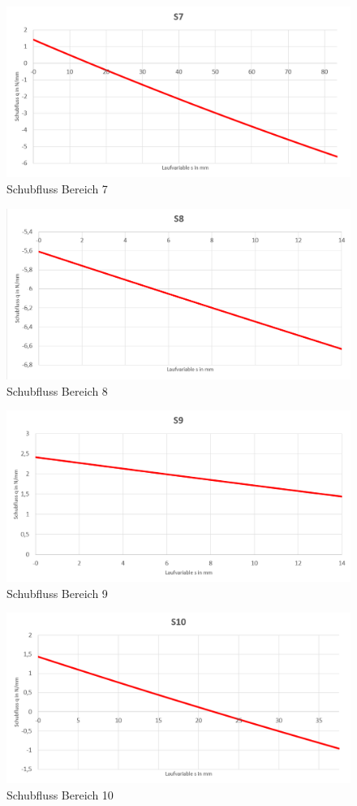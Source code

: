 \begin{figure}[h]
	\includegraphics[width=1.0\textwidth]{Bilder/S7.png}
	\caption{Schubfluss Bereich 7}
\end{figure}
\begin{figure}[h]
	\includegraphics[width=1.0\textwidth]{Bilder/S8.png}
	\caption{Schubfluss Bereich 8}
\end{figure}
\begin{figure}[h]
	\includegraphics[width=1.0\textwidth]{Bilder/S9.png}
	\caption{Schubfluss Bereich 9}
\end{figure}
\begin{figure}[h]
	\includegraphics[width=1.0\textwidth]{Bilder/S10.png}
	\caption{Schubfluss Bereich 10}
	\label{fig:S10}
\end{figure}
